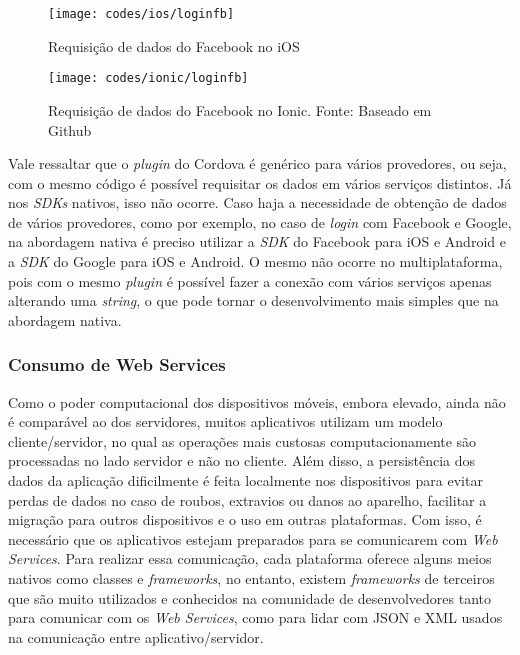 \begin{figure}[H]
	\centering
	\texttt{[image: codes/ios/loginfb]}
	\caption[Requisição de dados do Facebook no iOS]{Requisição de dados do Facebook no iOS}
	\label{fig:loginfb-ios}
\end{figure}

\begin{figure}[H]
	\centering
	\texttt{[image: codes/ionic/loginfb]}
	\caption[Requisição de dados do Facebook no Ionic]{Requisição de dados do Facebook no Ionic. Fonte: Baseado em Github\protect\footnotemark}
	\label{fig:loginfb-ios}
\end{figure}


Vale ressaltar que o \textit{plugin} do Cordova é genérico para vários provedores, ou seja, com o mesmo código é possível requisitar os dados em vários serviços distintos. Já nos \textit{SDKs} nativos, isso não ocorre.
Caso haja a necessidade de obtenção de dados de vários provedores, como por exemplo, no caso de \textit{login} com Facebook e Google, na abordagem nativa é preciso utilizar a \textit{SDK} do Facebook para iOS e Android
e a \textit{SDK} do Google para iOS e Android. O mesmo não ocorre no multiplataforma, pois com o mesmo \textit{plugin} é possível fazer a conexão com vários serviços apenas alterando uma \textit{string}, 
o que pode tornar o desenvolvimento mais simples que na abordagem nativa.

\subsubsection{Consumo de Web Services} \label{subsubsec:webservices}
Como o poder computacional dos dispositivos móveis, embora elevado, ainda não é comparável ao dos servidores, muitos aplicativos utilizam um modelo cliente/servidor, no qual
as operações mais custosas computacionamente são processadas no lado servidor e não no cliente. Além disso, a persistência dos dados da aplicação dificilmente é feita localmente nos dispositivos para evitar 
perdas de dados no caso de roubos, extravios ou danos ao aparelho, facilitar a migração para outros dispositivos e o uso em outras plataformas. Com isso, é necessário que os aplicativos estejam preparados para se 
comunicarem com \textit{Web Services}. Para realizar essa comunicação, cada plataforma oferece alguns meios nativos como classes e \textit{frameworks}, no entanto, existem \textit{frameworks} de terceiros que 
são muito utilizados e conhecidos na comunidade de desenvolvedores tanto para comunicar com os \textit{Web Services}, como para lidar com JSON e XML usados na comunicação entre aplicativo/servidor. 

